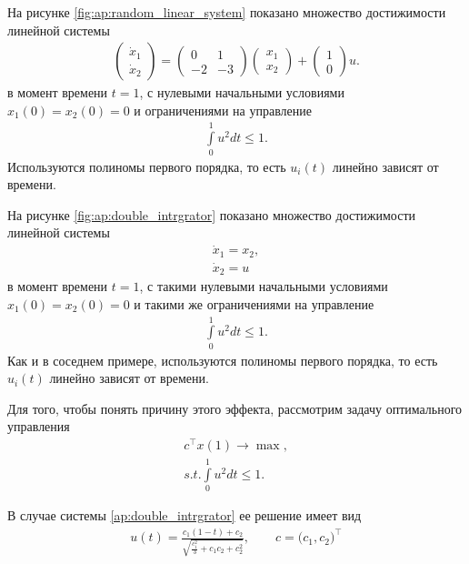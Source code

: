 \documentclass[../main.tex]{subfiles}
\begin{document}
 На рисунке \ref{fig:ap:random_linear_system} показано множество достижимости линейной системы
 \begin{gather}\label{ap:random_linear_system}
 	\begin{pmatrix} 
 		\dot{x}_1 \\
 		\dot{x}_2 
 	\end{pmatrix} = 
 	\begin{pmatrix}
 		0 & 1 \\
 		-2 & -3
 	\end{pmatrix}
 	\begin{pmatrix} 
 		x_1 \\
 		x_2 
 	\end{pmatrix} +
 	\begin{pmatrix} 1 \\ 0
 	\end{pmatrix} u.
 \end{gather}
 в момент времени $t = 1$, с нулевыми начальными условиями $x_1(0) = x_2(0) = 0 $ и ограничениями на управление 
 \begin{gather*}
 	\int\limits_0^1 u^2dt \leqslant 1.
 \end{gather*}
 Используются полиномы первого порядка, то есть $u_i(t) $ линейно зависят от времени.
 
  На рисунке \ref{fig:ap:double_intrgrator} показано множество достижимости линейной системы
 \begin{gather}\label{ap:double_intrgrator}
  \dot{x}_1 = x_2,\\
 	\dot{x}_2 = u
 \end{gather}
 в момент времени $t = 1$, с такими нулевыми начальными условиями $x_1(0) = x_2(0) = 0 $ и такими же ограничениями на управление 
 \begin{gather*}
 	\int\limits_0^1 u^2dt \leqslant 1.
 \end{gather*}
 Как и в соседнем примере, используются полиномы первого порядка, то есть $u_i(t) $ линейно зависят от времени.
 
 Для того, чтобы понять причину этого эффекта, рассмотрим задачу оптимального управления
 \begin{gather*}
 	c^{\top} x(1) \rightarrow \max, \\
 	s.t. 	\int\limits_0^1 u^2dt \leqslant 1.
 \end{gather*}
 
 В случае системы \eqref{ap:double_intrgrator} ее решение имеет вид
 \begin{gather*}
 	u(t) = \frac{c_1(1 - t) + c_2}{\sqrt{\frac{c_1^2}{3} + c_1 c_2 + c_2^2}}, \qquad c = \big(c_1, c_2 \big)^{\top}
 \end{gather*}
 
\end{document}
